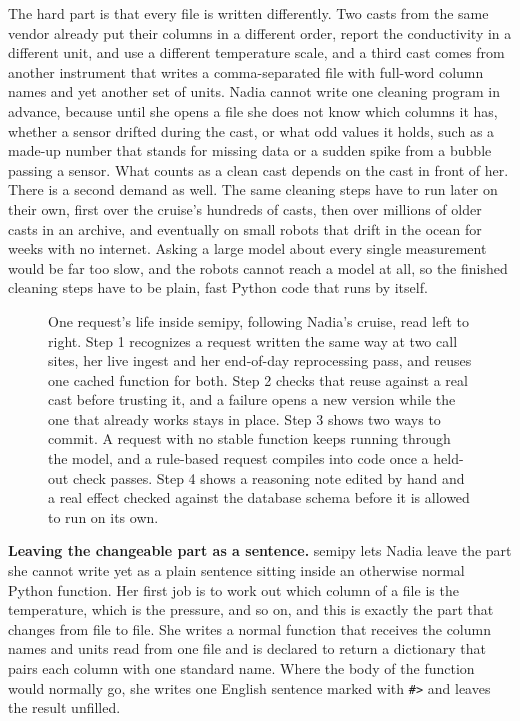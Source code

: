 \documentclass[9pt]{extarticle}
\begin{document}
The hard part is that every file is written differently. Two casts from the
same vendor already put their columns in a different order, report the
conductivity in a different unit, and use a different temperature scale, and a
third cast comes from another instrument that writes a comma-separated file
with full-word column names and yet another set of units. Nadia cannot write
one cleaning program in advance, because until she opens a file she does not
know which columns it has, whether a sensor drifted during the cast, or what
odd values it holds, such as a made-up number that stands for missing data or
a sudden spike from a bubble passing a sensor. What counts as a clean cast
depends on the cast in front of her. There is a second demand as well. The
same cleaning steps have to run later on their own, first over the cruise's
hundreds of casts, then over millions of older casts in an archive, and
eventually on small robots that drift in the ocean for weeks with no internet.
Asking a large model about every single measurement would be far too slow, and
the robots cannot reach a model at all, so the finished cleaning steps have to
be plain, fast Python code that runs by itself.

\begin{figure}[t]
  \centering
  
  \caption{One request's life inside semipy, following Nadia's cruise, read
  left to right. Step 1 recognizes a request written the same way at two call
  sites, her live ingest and her end-of-day reprocessing pass, and reuses one
  cached function for both. Step 2 checks that reuse against a real cast before
  trusting it, and a failure opens a new version while the one that already
  works stays in place. Step 3 shows two ways to commit. A request with no
  stable function keeps running through the model, and a rule-based request
  compiles into code once a held-out check passes. Step 4 shows a reasoning
  note edited by hand and a real effect checked against the database schema
  before it is allowed to run on its own.}
  \label{fig:flow}
\end{figure}

\textbf{Leaving the changeable part as a sentence.} semipy lets Nadia leave
the part she cannot write yet as a plain sentence sitting inside an otherwise
normal Python function. Her first job is to work out which column of a file is
the temperature, which is the pressure, and so on, and this is exactly the
part that changes from file to file. She writes a normal function that
receives the column names and units read from one file and is declared to
return a dictionary that pairs each column with one standard name. Where the
body of the function would normally go, she writes one English sentence marked
with \verb|#>| and leaves the result unfilled.
\end{document}
